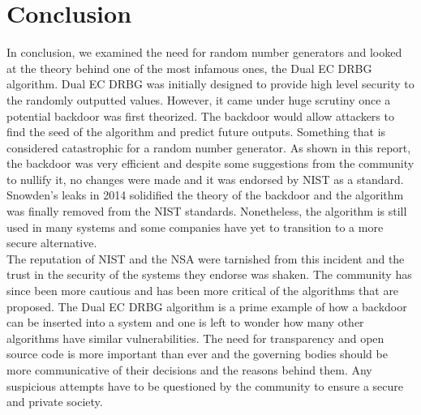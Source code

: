 \section{Conclusion}

In conclusion, we examined the need for random number generators and looked at the theory behind one of the most infamous ones, the Dual EC DRBG algorithm. Dual EC DRBG was initially designed to provide high level security to the randomly outputted values. However, it came under huge scrutiny once a potential backdoor was first theorized. The backdoor would allow attackers to find the seed of the algorithm and predict future outputs. Something that is considered catastrophic for a random number generator. As shown in this report, the backdoor was very efficient and despite some suggestions from the community to nullify it, no changes were made and it was endorsed by NIST as a standard. Snowden's leaks in 2014 solidified the theory of the backdoor and the algorithm was finally removed from the NIST standards. Nonetheless, the algorithm is still used in many systems and some companies have yet to transition to a more secure alternative.
\\

The reputation of NIST and the NSA were tarnished from this incident and the trust in the security of the systems they endorse was shaken. The community has since been more cautious and has been more critical of the algorithms that are proposed. The Dual EC DRBG algorithm is a prime example of how a backdoor can be inserted into a system and one is left to wonder how many other algorithms have similar vulnerabilities. The need for transparency and open source code is more important than ever and the governing bodies should be more communicative of their decisions and the reasons behind them. Any suspicious attempts have to be questioned by the community to ensure a secure and private society.